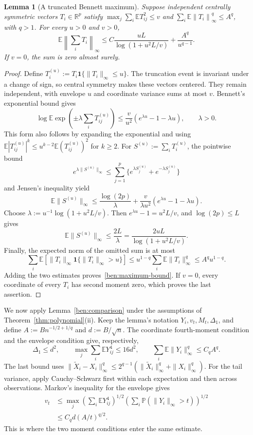 \documentclass[11pt,letterpaper]{article}
\newtheorem{lemma}{Lemma}
\theoremstyle{remark}
\newcommand{\E}{\mathbb E}
\newcommand{\Pp}{\mathbb P}
\newcommand{\R}{\mathbb R}
\newcommand{\norm}[1]{\left\lVert#1\right\rVert}
\newcommand{\ind}{\mathbf 1}
\begin{document}
\begin{lemma}[A truncated Bennett maximum]\label{ben:maximum}
Suppose independent centrally symmetric vectors $T_i\in\R^p$
satisfy $\max_j\sum_i\E T_{ij}^2\le v$ and
$\sum_i\E\norm{T_i}_\infty^q\le A^q$, with $q>1$.
For every $u>0$ and $v>0$,
\begin{equation}
 \E\norm{\sum_iT_i}_\infty
 \le C\frac{uL}{\log(1+u^2L/v)}+\frac{A^q}{u^{q-1}}.
 \label{ben:maximum-bound}
\end{equation}
If $v=0$, the sum is zero almost surely.
\end{lemma}
\begin{proof}
Define $T_i^{(u)}:=T_i\ind\{\|T_i\|_\infty\le u\}$.
The truncation event is invariant under a change of sign, so
central symmetry makes these vectors centered. They remain
independent, with envelope $u$ and coordinate variance sums at
most $v$. Bennett's exponential bound
\cite[Theorem~2.9]{BLM2013} gives
\[
 \log\E\exp\left(\pm\lambda\sum_iT_{ij}^{(u)}\right)
 \le\frac v{u^2}(e^{\lambda u}-1-\lambda u),\qquad\lambda>0.
\]
This form also follows by expanding the exponential and using
$\E|T_{ij}^{(u)}|^k\le u^{k-2}\E(T_{ij}^{(u)})^2$ for
$k\ge2$. For $S^{(u)}:=\sum_iT_i^{(u)}$, the pointwise bound
\[
 e^{\lambda\|S^{(u)}\|_\infty}
 \le\sum_{j=1}^p\{e^{\lambda S_j^{(u)}}+e^{-\lambda S_j^{(u)}}\}
\]
and Jensen's inequality yield
\[
 \E\|S^{(u)}\|_\infty
 \le\frac{\log(2p)}\lambda
      +\frac v{\lambda u^2}(e^{\lambda u}-1-\lambda u).
\]
Choose $\lambda:=u^{-1}\log(1+u^2L/v)$. Then
$e^{\lambda u}-1=u^2L/v$, and $\log(2p)\le L$ gives
\[
 \E\|S^{(u)}\|_\infty
 \le\frac{2L}{\lambda}
 =\frac{2uL}{\log(1+u^2L/v)}.
\]
Finally, the expected norm of the omitted sum is at most
\[
 \sum_i\E[\|T_i\|_\infty\ind\{\|T_i\|_\infty>u\}]
 \le u^{1-q}\sum_i\E\|T_i\|_\infty^q
 \le A^qu^{1-q}.
\]
Adding the two estimates proves~\eqref{ben:maximum-bound}.
If $v=0$, every coordinate of every $T_i$ has second moment
zero, which proves the last assertion.
\end{proof}

We now apply Lemma~\ref{ben:comparison} under the assumptions of
Theorem~\ref{thm:polynomial}\textup{(ii)}. Keep the lemma's
notation $Y_i,v_t,M_t,\Delta_1$, and define
$A:=Bn^{-1/2+1/q}$ and $d:=B/\sqrt n$. The coordinate
fourth-moment condition and the envelope condition give, respectively,
\[
 \Delta_1\le d^2,\qquad
 \max_j\sum_i\E Y_{ij}^4\le16d^2,\qquad
 \sum_i\E\|Y_i\|_\infty^q\le C_qA^q.
\]
The last bound uses
$\|\widetilde X_i-X_i\|_\infty^q
\le2^{q-1}(\|\widetilde X_i\|_\infty^q+\|X_i\|_\infty^q)$.
For the tail variance, apply Cauchy--Schwarz first within each
expectation and then across observations. Markov's inequality
for the envelope gives
\begin{equation}
 \begin{split}
 v_t&\le
 \max_j\left(\sum_i\E Y_{ij}^4\right)^{1/2}
       \left(\sum_i\Pp(\|Y_i\|_\infty>t)\right)^{1/2}\\
 &\le C_qd(A/t)^{q/2}.
 \end{split}
 \label{ben:mixed}
\end{equation}
This is where the two moment conditions enter the same estimate.
\end{document}
